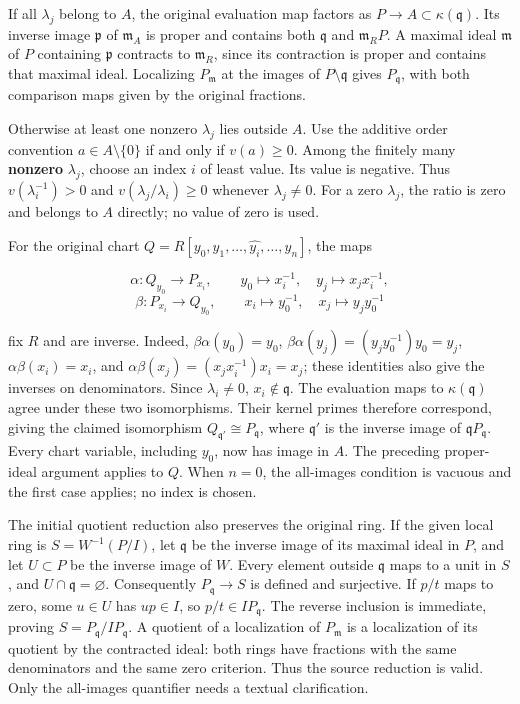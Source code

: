If all \(\lambda_j\) belong to \(A\), the original evaluation map factors as \(P\to A\subset\kappa(\mathfrak q)\). Its inverse image \(\mathfrak p\) of \(\mathfrak m_A\) is proper and contains both \(\mathfrak q\) and \(\mathfrak m_RP\). A maximal ideal \(\mathfrak m\) of \(P\) containing \(\mathfrak p\) contracts to \(\mathfrak m_R\), since its contraction is proper and contains that maximal ideal. Localizing \(P_{\mathfrak m}\) at the images of \(P\setminus\mathfrak q\) gives \(P_{\mathfrak q}\), with both comparison maps given by the original fractions.

Otherwise at least one nonzero \(\lambda_j\) lies outside \(A\). Use the additive order convention \(a\in A\setminus\{0\}\) if and only if \(v(a)\geq0\). Among the finitely many \textbf{nonzero} \(\lambda_j\), choose an index \(i\) of least value. Its value is negative. Thus \(v(\lambda_i^{-1})>0\) and \(v(\lambda_j/\lambda_i)\geq0\) whenever \(\lambda_j\ne0\). For a zero \(\lambda_j\), the ratio is zero and belongs to \(A\) directly; no value of zero is used.

For the original chart \(Q=R[y_0,y_1,\ldots,\widehat{y_i},\ldots,y_n]\), the maps

\[
\alpha:Q_{y_0}\longrightarrow P_{x_i},\qquad
y_0\longmapsto x_i^{-1},\quad y_j\longmapsto x_jx_i^{-1},
\] \[
\beta:P_{x_i}\longrightarrow Q_{y_0},\qquad
x_i\longmapsto y_0^{-1},\quad x_j\longmapsto y_jy_0^{-1}
\]

fix \(R\) and are inverse. Indeed, \(\beta\alpha(y_0)=y_0\), \(\beta\alpha(y_j)=(y_jy_0^{-1})y_0=y_j\), \(\alpha\beta(x_i)=x_i\), and \(\alpha\beta(x_j)=(x_jx_i^{-1})x_i=x_j\); these identities also give the inverses on denominators. Since \(\lambda_i\ne0\), \(x_i\notin\mathfrak q\). The evaluation maps to \(\kappa(\mathfrak q)\) agree under these two isomorphisms. Their kernel primes therefore correspond, giving the claimed isomorphism \(Q_{\mathfrak q'}\cong P_{\mathfrak q}\), where \(\mathfrak q'\) is the inverse image of \(\mathfrak qP_{\mathfrak q}\). Every chart variable, including \(y_0\), now has image in \(A\). The preceding proper-ideal argument applies to \(Q\). When \(n=0\), the all-images condition is vacuous and the first case applies; no index is chosen.

The initial quotient reduction also preserves the original ring. If the given local ring is \(S=W^{-1}(P/I)\), let \(\mathfrak q\) be the inverse image of its maximal ideal in \(P\), and let \(U\subset P\) be the inverse image of \(W\). Every element outside \(\mathfrak q\) maps to a unit in \(S\), and \(U\cap\mathfrak q=\varnothing\). Consequently \(P_{\mathfrak q}\to S\) is defined and surjective. If \(p/t\) maps to zero, some \(u\in U\) has \(up\in I\), so \(p/t\in IP_{\mathfrak q}\). The reverse inclusion is immediate, proving \(S=P_{\mathfrak q}/IP_{\mathfrak q}\). A quotient of a localization of \(P_{\mathfrak m}\) is a localization of its quotient by the contracted ideal: both rings have fractions with the same denominators and the same zero criterion. Thus the source reduction is valid. Only the all-images quantifier needs a textual clarification.

